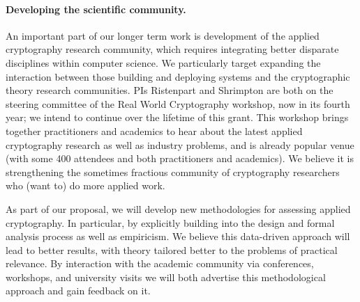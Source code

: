 \paragraph{Developing the scientific community.} An important part of our longer
term work is development of the applied cryptography research community, which
requires integrating better disparate disciplines within computer science. We
particularly target expanding the interaction between those building and
deploying systems and the cryptographic theory research communities.  PIs
Ristenpart and Shrimpton are both on the steering committee of the Real World
Cryptography workshop, now in its fourth year; we intend to continue
over the lifetime of this grant.  This workshop brings
together practitioners and academics to hear about the latest applied
cryptography research as well as industry problems, and is already
popular venue (with some 400 attendees and both practitioners and
academics). We believe it is strengthening the sometimes fractious community of
cryptography researchers who (want to) do more applied work. 

As part of our proposal, we will develop new methodologies for assessing applied
cryptography. In particular, by explicitly building into the design and formal
analysis process as well as empiricism. We believe this data-driven approach
will lead to better results, with theory tailored better to  the problems of
practical relevance. By interaction with the academic community via conferences,
workshops, and university visits we will both advertise this methodological
approach and gain feedback on it. 




